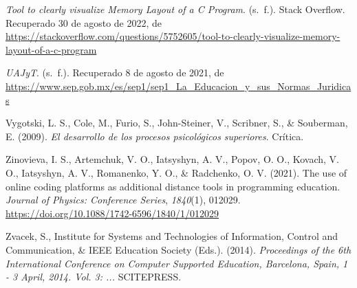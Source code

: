\documentclass[
  12,
]{scrartcl}
\newlength{\cslhangindent}
\newlength{\cslentryspacingunit} %
\newenvironment{CSLReferences}[2] %
 {%
  \setlength{\parindent}{0pt}
  \ifodd #1
  \let\oldpar\par
  \def\par{\hangindent=\cslhangindent\oldpar}
  \fi
  \setlength{\parskip}{#2\cslentryspacingunit}
 }%
 {}
\begin{document}
\begin{CSLReferences}{1}{0}
\leavevmode\hypertarget{ref-oYJa6rHx}{}%
\emph{Tool to clearly visualize Memory Layout of a C Program}. (s.~f.).
Stack Overflow. Recuperado 30 de agosto de 2022, de
\url{https://stackoverflow.com/questions/5752605/tool-to-clearly-visualize-memory-layout-of-a-c-program}

\leavevmode\hypertarget{ref-10ZfexQUS}{}%
\emph{UAJyT}. (s.~f.). Recuperado 8 de agosto de 2021, de
\url{https://www.sep.gob.mx/es/sep1/sep1_La_Educacion_y_sus_Normas_Juridicas}

\leavevmode\hypertarget{ref-vy7gNH8L}{}%
Vygotski, L. S., Cole, M., Furio, S., John-Steiner, V., Scribner, S., \&
Souberman, E. (2009). \emph{El desarrollo de los procesos psicológicos
superiores}. Crítica.

\leavevmode\hypertarget{ref-hzq61Gnz}{}%
Zinovieva, I. S., Artemchuk, V. O., Iatsyshyn, A. V., Popov, O. O.,
Kovach, V. O., Iatsyshyn, A. V., Romanenko, Y. O., \& Radchenko, O. V.
(2021). The use of online coding platforms as additional distance tools
in programming education. \emph{Journal of Physics: Conference Series},
\emph{1840}(1), 012029.
\url{https://doi.org/10.1088/1742-6596/1840/1/012029}

\leavevmode\hypertarget{ref-11mdjMtw7}{}%
Zvacek, S., Institute for Systems and Technologies of Information,
Control and Communication, \& IEEE Education Society (Eds.). (2014).
\emph{Proceedings of the 6th International Conference on Computer
Supported Education, Barcelona, Spain, 1 - 3 April, 2014. Vol. 3: ...}
SCITEPRESS.

\end{CSLReferences}
\end{document}
